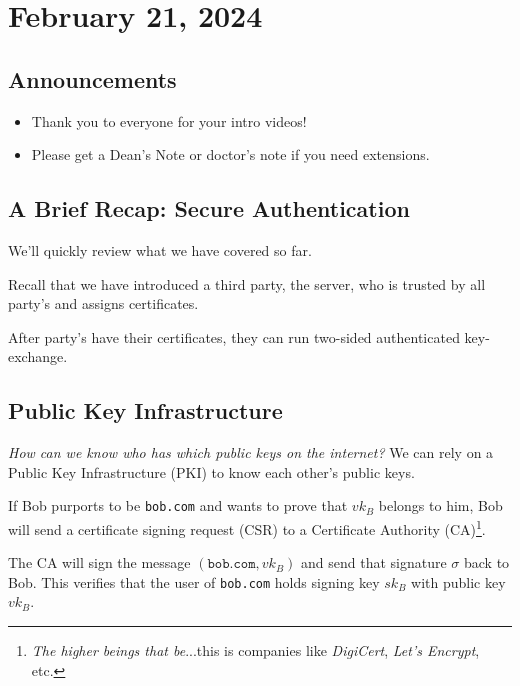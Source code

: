 \section{February 21, 2024}
\label{20240221}

\subsection{Announcements}

\begin{itemize}
    \item Thank you to everyone for your intro videos!
    \item Please get a Dean's Note or doctor's note if you need extensions.
\end{itemize}

\subsection{A Brief Recap: Secure Authentication}

We'll quickly review what we have covered so far.

Recall that we have introduced a third party, the server, who is trusted by all party's and assigns certificates.


After party's have their certificates, they can run two-sided authenticated key-exchange.


\subsection{Public Key Infrastructure}

\emph{How can we know who has which public keys on the internet?} We can rely on a Public Key Infrastructure (PKI) to know each other's public keys.

If Bob purports to be \texttt{bob.com} and wants to prove that $vk_B$ belongs to him, Bob will send a certificate signing request (CSR) to a Certificate Authority (CA)\footnote{\emph{The higher beings that be}...this is companies like \emph{DigiCert}, \emph{Let's Encrypt}, etc.}.

The CA will sign the message $(\mathtt{bob.com}, vk_B)$ and send that signature $\sigma$ back to Bob. This verifies that the user of \texttt{bob.com} holds signing key $sk_B$ with public key $vk_B$.

